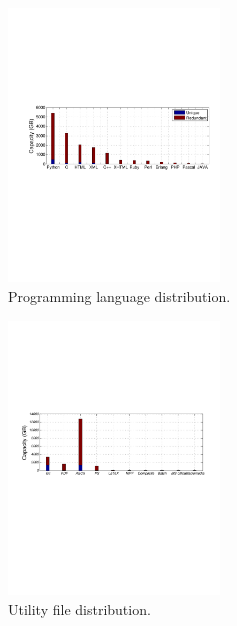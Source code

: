 \begin{figure}
	\centering
	\includegraphics[width=0.5\textwidth]{graphs/type-lang-cap}
	\caption{Programming language distribution.
	}
	\label{fig:file-type-lang}
\end{figure}

\begin{figure}
	\centering
	\includegraphics[width=0.5\textwidth]{graphs/type-utili-cap}
	\caption{Utility file distribution.
	}
	\label{fig:file_size}
\end{figure}

